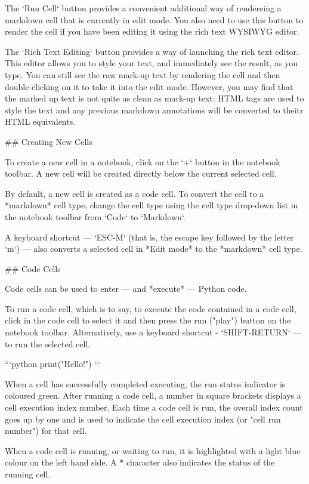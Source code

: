 \documentclass[letterpaper,10pt,english]{sphinxmanual}
\begin{document}
The `Run Cell` button provides a convenient additional way of rendereing a markdown cell that is currently in edit mode. You also need to use this button to render the cell if you have been editing it using the rich text WYSIWYG editor.

The `Rich Text Editing` button provides a way of launching the rich text editor. This editor allows you to style your text, and immediately see the result, as you type. You can still see the raw mark-up text by rendering the cell and then double clicking on it to take it into the edit mode. However, you may find that the marked up text is not quite as clean as mark-up text: HTML tags are used to style the text and any previous markdown annotations will be converted to theitr HTML equivalents.


## Creating New Cells

To create a new cell in a notebook, click on the `+` button in the notebook toolbar. A new cell will be created directly below the current selected cell.

By default, a new cell is created as a code cell. To convert the cell to a *markdown* cell type, change the cell type using the cell type drop-down list in the notebook toolbar from `Code` to `Markdown`.

A keyboard shortcut — `ESC-M` (that is, the escape key followed by the letter `m`) — also converts a selected cell in *Edit mode* to the *markdown* cell type.


## Code Cells

Code cells can be used to enter — and *execute* — Python code.

To run a code cell, which is to say, to execute the code contained in a code cell, click in the code cell to select it and then press the run ("play") button on the notebook toolbar. Alternatively, use a keyboard shortcut - `SHIFT-RETURN` — to run the selected cell.

```python
print("Hello!")
```

When a cell has successfully completed executing, the run status indicator is coloured green. After running a code cell, a number in square brackets displays a cell execution index number. Each time a code cell is run, the overall index count goes up by one and is used to indicate the cell execution index (or "cell run number") for that cell.

When a code cell is running, or waiting to run, it is highlighted with a light blue colour on the left hand side. A * character also indicates the status of the running cell.
\end{document}
